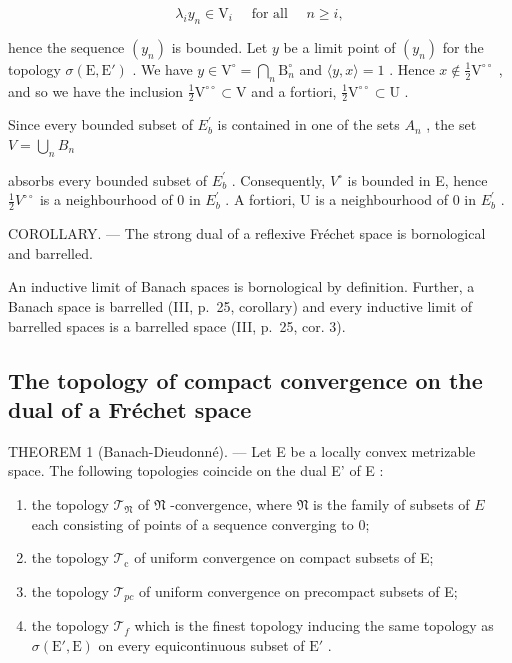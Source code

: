 \[
\lambda_ {i} y _ {n} \in \mathrm{V} _ {i} \quad \text { for   all } \quad n \geqslant i  ,\tag{3}
\]

hence the sequence \((y_{n})\) is bounded. Let \(y\) be a limit point of \((y_{n})\) for the topology \(\sigma(\mathrm{E},\mathrm{E}')\) . We have \(y\in\mathrm{V}^{\circ}=\bigcap_{n}\mathrm{B}_{n}^{\circ}\) and \(\langle y,x\rangle=1\) . Hence \(x\notin\frac{1}{2}\mathrm{V}^{\circ\circ}\) , and so we have the inclusion \(\frac{1}{2}\mathrm{V}^{\circ\circ}\subset\mathrm{V}\) and a fortiori, \(\frac{1}{2}\mathrm{V}^{\circ\circ}\subset\mathrm{U}\) .

Since every bounded subset of \(E_{b}^{\prime}\) is contained in one of the sets \(A_{n}\) , the set \(V = \bigcup_{n} B_{n}\)

absorbs every bounded subset of \(E_{b}^{\prime}\) . Consequently, \(V^{\circ}\) is bounded in E, hence \(\frac{1}{2}V^{\circ\circ}\) is a neighbourhood of 0 in \(E_{b}^{\prime}\) . A fortiori, U is a neighbourhood of 0 in \(E_{b}^{\prime}\) .

COROLLARY. --- The strong dual of a reflexive Fréchet space is bornological and barrelled.

An inductive limit of Banach spaces is bornological by definition. Further, a Banach space is barrelled (III, p.~25, corollary) and every inductive limit of barrelled spaces is a barrelled space (III, p.~25, cor. 3).

\subsection{The topology of compact convergence on the dual of a Fréchet space}

THEOREM 1 (Banach-Dieudonné). --- Let E be a locally convex metrizable space. The following topologies coincide on the dual E' of E :

\begin{enumerate}
\def\labelenumi{\alph{enumi})}
\item
  the topology \(\mathcal{T}_{\mathfrak{N}}\) of \(\mathfrak{N}\) -convergence, where \(\mathfrak{N}\) is the family of subsets of \(E\) each consisting of points of a sequence converging to 0;
\item
  the topology \(\mathcal{T}_{\mathrm{c}}\) of uniform convergence on compact subsets of E;
\item
  the topology \(\mathcal{T}_{pc}\) of uniform convergence on precompact subsets of E;
\item
  the topology \(\mathcal{T}_f\) which is the finest topology inducing the same topology as \(\sigma(\mathrm{E}',\mathrm{E})\) on every equicontinuous subset of \(\mathrm{E}'\) .
\end{enumerate}

